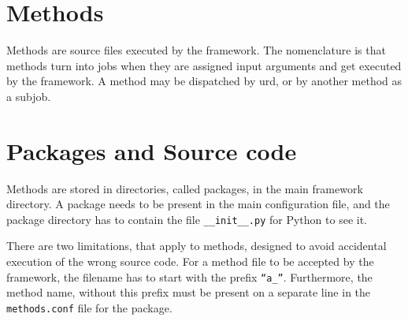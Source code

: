 
\section{Methods}

Methods are source files executed by the framework.  The nomenclature
is that methods turn into jobs when they are assigned input arguments
and get executed by the framework.  A method may be dispatched by urd,
or by another method as a subjob.



\section{Packages and Source code}

Methods are stored in directories, called packages, in the main
framework directory.  A package needs to be present in the main
configuration file, and the package directory has to contain the file
\texttt{\_\_init\_\_.py} for Python to see it.

There are two limitations, that apply to methods, designed to avoid
accidental execution of the wrong source code.  For a method file to
be accepted by the framework, the filename has to start with the
prefix \texttt{``a\_''}.  Furthermore, the method name, without this
prefix must be present on a separate line in the \texttt{methods.conf}
file for the package.



